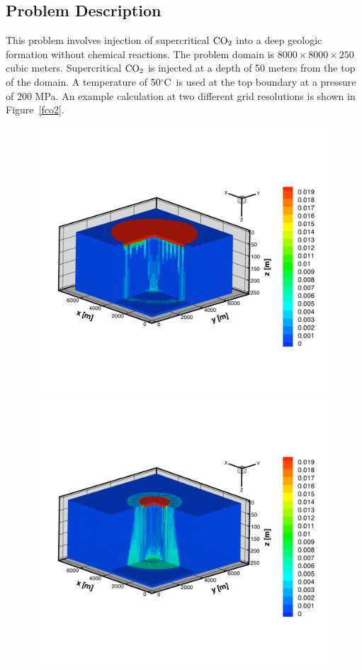 \documentclass[12pt]{article}
\newcommand{\degc}{$^\circ$C}
\renewcommand{\c}{{\rm CO_2}}
\begin{document}
\subsection{Problem Description}

This problem involves injection of supercritical $\c$ into a deep geologic formation without chemical reactions. The problem domain is $8000\!\times\!8000\!\times\!250$ cubic meters. Supercritical $\c$ is injected at a depth of 50 meters from the top of the domain. A temperature of 50\degc\ is used at the top boundary at a pressure of $200$ MPa.
An example calculation at two different grid resolutions is shown in Figure~\ref{fco2}.


\begin{figure}[t!]\centering
\includegraphics[height=0.325\textheight]{./figs/xl300y-pri-coarse}
  
\vspace{-2.5cm}
  
\includegraphics[height=0.325\textheight]{./figs/xl300y-pri-fine} 
  

\end{figure}
\end{document}
